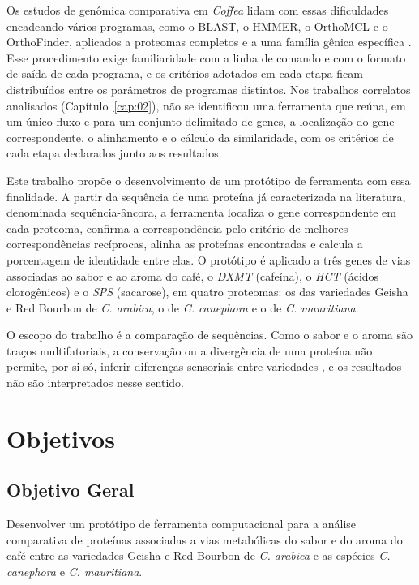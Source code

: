 Os estudos de genômica comparativa em \textit{Coffea} lidam com essas dificuldades encadeando vários programas, como o BLAST, o HMMER, o OrthoMCL e o OrthoFinder, aplicados a proteomas completos e a uma família gênica específica \cite{Santos2022, Park2025}. Esse procedimento exige familiaridade com a linha de comando e com o formato de saída de cada programa, e os critérios adotados em cada etapa ficam distribuídos entre os parâmetros de programas distintos. Nos trabalhos correlatos analisados (Capítulo~\ref{cap:02}), não se identificou uma ferramenta que reúna, em um único fluxo e para um conjunto delimitado de genes, a localização do gene correspondente, o alinhamento e o cálculo da similaridade, com os critérios de cada etapa declarados junto aos resultados.

Este trabalho propõe o desenvolvimento de um protótipo de ferramenta com essa finalidade. A partir da sequência de uma proteína já caracterizada na literatura, denominada sequência-âncora, a ferramenta localiza o gene correspondente em cada proteoma, confirma a correspondência pelo critério de melhores correspondências recíprocas, alinha as proteínas encontradas e calcula a porcentagem de identidade entre elas. O protótipo é aplicado a três genes de vias associadas ao sabor e ao aroma do café, o \textit{DXMT} (cafeína), o \textit{HCT} (ácidos clorogênicos) e o \textit{SPS} (sacarose), em quatro proteomas: os das variedades Geisha e Red Bourbon de \textit{C. arabica}, o de \textit{C. canephora} e o de \textit{C. mauritiana}.

O escopo do trabalho é a comparação de sequências. Como o sabor e o aroma são traços multifatoriais, a conservação ou a divergência de uma proteína não permite, por si só, inferir diferenças sensoriais entre variedades \cite{Privat2008, Buffo2004}, e os resultados não são interpretados nesse sentido.

\section{Objetivos}
\label{sec:objetivos}

\subsection{Objetivo Geral}

Desenvolver um protótipo de ferramenta computacional para a análise comparativa de proteínas associadas a vias metabólicas do sabor e do aroma do café entre as variedades Geisha e Red Bourbon de \textit{C. arabica} e as espécies \textit{C. canephora} e \textit{C. mauritiana}.

